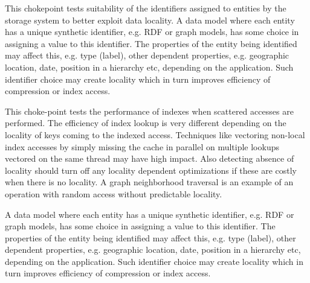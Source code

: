 This chokepoint tests suitability of the identifiers assigned to entities by the storage system to better exploit data locality. A data model where each entity has a unique synthetic identifier,
e.g. RDF or graph models, has some choice in assigning a value to this identifier. The properties of the entity being identified may affect this, e.g. type (label), other dependent properties,
e.g. geographic location, date, position in a hierarchy etc, depending on the application. Such identifier choice may create locality which in turn improves efficiency of compression or index access.




This choke-point tests the performance of indexes when scattered accesses are performed. The efficiency of index lookup is very different depending on the locality of keys coming to the indexed access.
Techniques like vectoring non-local index accesses by simply missing the cache in parallel on multiple lookups vectored on the same thread may have high impact.
Also detecting absence of locality should turn off any locality dependent optimizations if these are costly when there is no locality. A graph neighborhood traversal is an example of an operation with random access without predictable locality.

%


%


A data model where each entity has a unique synthetic identifier, e.g. RDF or graph models, has some choice in assigning a value to this identifier. The properties of the entity being identified may affect this, e.g. type (label), other dependent properties, e.g. geographic location, date, position in a hierarchy etc, depending on the application. Such identifier choice may create locality which in turn improves efficiency of compression or index access.

%


